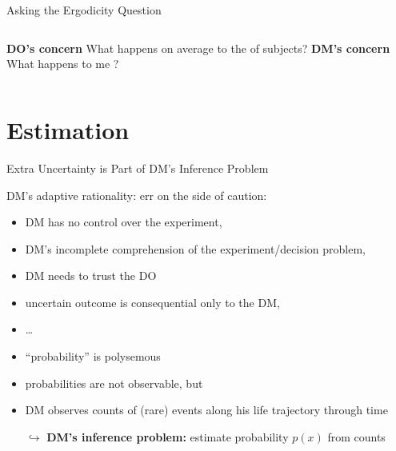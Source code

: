 \begin{frame}{Asking the Ergodicity Question}
\begin{columns}[T]
	\bc \textbf{DO's concern} \ec
	What happens on average to the  of subjects?
\centering \vspace{4em}  \red{\large $\neq$}
	\bc \textbf{DM's concern} \ec
	What happens to me ?
\end{columns}
\end{frame}


\section{Estimation}
\begin{frame}[allowframebreaks]{Extra Uncertainty is Part of DM's Inference Problem}

DM's adaptive rationality: err on the side of caution:
\begin{itemize}
  \item DM has no control over the experiment,
	\item DM's incomplete comprehension of the experiment/decision problem,
	\item DM needs to trust the DO
	\item uncertain outcome is consequential only to the DM,
	\item \ldots
\end{itemize}

\framebreak

\begin{itemize}
	\item ``probability'' is polysemous 
  \item probabilities are not observable, but
  \item DM observes counts of (rare) events along his life trajectory through time
  \item[$\hookrightarrow$] \textbf{DM's inference problem:} estimate probability $p(x)$ from counts
\end{itemize}
\end{frame}


